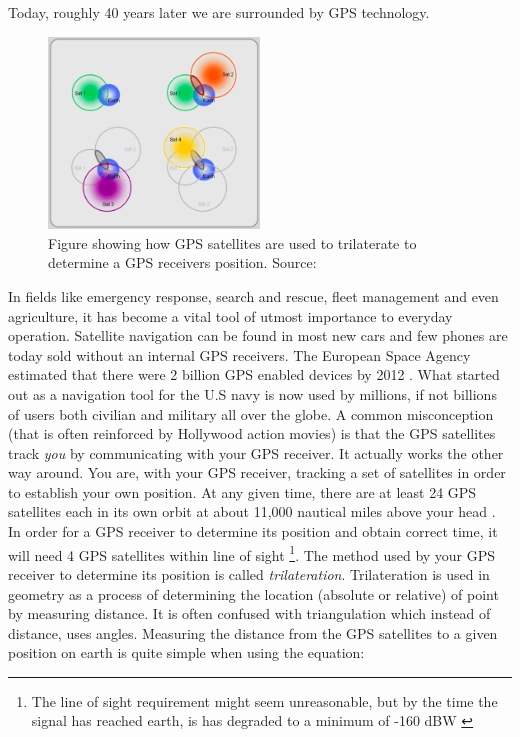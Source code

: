\documentclass[12pt,english,a4paper]{article}
\begin{document}
Today, roughly 40 years later we are surrounded by GPS technology.
\begin{figure}
  \centering
  \includegraphics[width=0.50\textwidth]{trilaterate.jpg}
  \caption[GPS trilaterate figure]
   {Figure showing how GPS satellites are used to trilaterate to determine a GPS receivers position. Source: \cite{GISTRILATERATE}}
\end{figure}
In fields like emergency response, search and rescue, fleet management and even agriculture, it has become a vital tool of utmost importance to everyday operation. Satellite navigation can be found in most new cars and few phones are today sold without an internal GPS receivers. The European Space Agency estimated that there were 2 billion GPS enabled devices by 2012 \cite{ESA}. What started out as a navigation tool for the U.S navy is now used by millions, if not billions of users both civilian and military all over the globe. A common misconception (that is often reinforced by Hollywood action movies) is that the GPS satellites track \textit{you} by communicating with your GPS receiver. It actually works the other way around. You are, with your GPS receiver, tracking a set of satellites in order to establish your own position. At any given time, there are at least 24 GPS satellites each in its own orbit at about 11,000 nautical miles above your head \cite{GPSGOVSS}. In order for a GPS receiver to determine its position and obtain correct time, it will need 4 GPS satellites within line of sight \footnote{The line of sight requirement might seem unreasonable, but by the time the signal has reached earth, is has degraded to a minimum of -160 dBW \cite{NATINT}}.
The method used by your GPS receiver to determine its position is called \textit{trilateration}. 
Trilateration is used in geometry as a process of determining the location (absolute or relative) of point by measuring distance. It is often confused with triangulation which instead of distance, uses angles. Measuring the distance from the GPS satellites to a given position on earth is quite simple when using the equation: 
\end{document}
